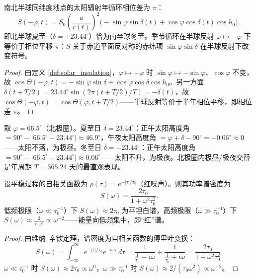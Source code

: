 \begin{proposition}[南北半球季节的相位对称]\label{prop:seasonal_phase_symmetry}
南北半球同纬度地点的太阳辐射年循环相位差为 $\pi$：
\[
S(-\varphi, t) = S_0\left(\frac{a}{r(t)}\right)^2 \big(-\sin\varphi \sin\delta(t) + \cos\varphi \cos\delta(t) \cos h_0 \big),
\]
即北半球夏至（$\delta = +23.44^\circ$）恰为南半球冬至。季节循环在半球反射 $\varphi \mapsto -\varphi$ 下等价于相位平移 $\pi$：$S$ 关于赤道平面反对称的赤纬项 $\sin\varphi\sin\delta$ 在半球反射下改变符号。
\end{proposition}

\begin{proof}
由定义 \ref{def:solar_insolation}，$\varphi \mapsto -\varphi$ 时 $\sin\varphi \mapsto -\sin\varphi$、$\cos\varphi$ 不变，故 $\cos\Theta(-\varphi,t) = -\sin\varphi\sin\delta + \cos\varphi\cos\delta\cos h_0$。另一方面 $\delta(t + T/2) = 23.44^\circ\sin(2\pi(t+T/2)/T) = -\delta(t)$，故 $\cos\Theta(-\varphi, t) = \cos\Theta(\varphi, t + T/2)$——半球反射等价于半年相位平移，即相位差 $\pi$。
\end{proof}

\begin{example}\label{ex:polar_day_night}
取 $\varphi = 66.5^\circ$（北极圈）。夏至日 $\delta = 23.44^\circ$：正午太阳高度角 $= 90^\circ - |66.5^\circ - 23.44^\circ| \approx 46.9^\circ$，午夜太阳高度角 $= \varphi + \delta - 90^\circ = -0.06^\circ \approx 0$——太阳不落，为极昼。冬至日 $\delta = -23.44^\circ$：正午太阳高度角 $= 90^\circ - |66.5^\circ + 23.44^\circ| \approx 0.06^\circ$——太阳不升，为极夜。北极圈内极昼/极夜交替是年周期 $T = 365.24$ 天的最直观表现。
\end{example}

\begin{lemma}[红噪声谱与指数自相关的对偶]\label{ch28_red_noise_duality}
设平稳过程的自相关函数为 $\rho(\tau) = e^{-|\tau|/\tau_0}$（红噪声）。则其功率谱密度为
\[
S(\omega) = \frac{2\tau_0}{1 + \omega^2 \tau_0^2}.
\]
低频极限（$\omega \ll \tau_0^{-1}$）下 $S(\omega) \approx 2\tau_0$ 为平坦白谱，高频极限（$\omega \gg \tau_0^{-1}$）下 $S(\omega) \approx \frac{2}{\tau_0 \omega^2} \propto \omega^{-2}$——能量向低频集中，即“红”谱。
\end{lemma}

\begin{proof}
由维纳–辛钦定理，谱密度为自相关函数的傅里叶变换：
\[
S(\omega) = \int_{-\infty}^{\infty} e^{-|\tau|/\tau_0} e^{-i\omega\tau}\, d\tau
= \frac{1}{\frac{1}{\tau_0} - i\omega} + \frac{1}{\frac{1}{\tau_0} + i\omega} = \frac{2\tau_0}{1+\omega^2\tau_0^2}.
\]
$\omega \ll \tau_0^{-1}$ 时 $S(\omega) \approx 2\tau_0 \propto \omega^{0}$，$\omega \gg \tau_0^{-1}$ 时 $S(\omega) \approx 2/(\tau_0 \omega^2) \propto \omega^{-2}$。
\end{proof}

